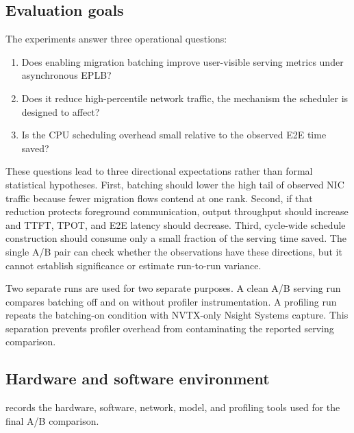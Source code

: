 \label{ch:methodology}

\subsection{Evaluation goals}

The experiments answer three operational questions:

\begin{enumerate}
  \item Does enabling migration batching improve user-visible serving metrics
  under asynchronous EPLB?
  \item Does it reduce high-percentile network traffic, the mechanism the
  scheduler is designed to affect?
  \item Is the CPU scheduling overhead small relative to the observed E2E time
  saved?
\end{enumerate}

These questions lead to three directional expectations rather than formal
statistical hypotheses. First, batching should lower the high tail of observed
NIC traffic because fewer migration flows contend at one rank. Second, if that
reduction protects foreground communication, output throughput should increase
and TTFT, TPOT, and E2E latency should decrease. Third, cycle-wide schedule
construction should consume only a small fraction of the serving time saved.
The single A/B pair can check whether the observations have these directions,
but it cannot establish significance or estimate run-to-run variance.

Two separate runs are used for two separate purposes. A clean A/B serving run
compares batching off and on without profiler instrumentation. A profiling run
repeats the batching-on condition with NVTX-only Nsight Systems capture. This
separation prevents profiler overhead from contaminating the reported serving
comparison.

\subsection{Hardware and software environment}

 records the hardware, software, network, model, and
profiling tools used for the final A/B comparison.

